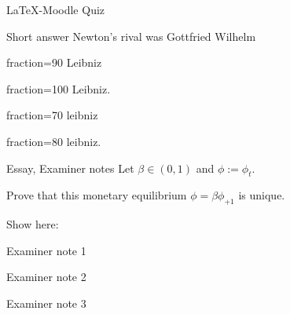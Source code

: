 \documentclass{article}
\begin{document}
\begin{quiz}{LaTeX-Moodle Quiz}
    \begin{shortanswer}[usecase]{Short answer}
        Newton's rival was Gottfried Wilhelm \blank
        \item[fraction=90] Leibniz
        \item[fraction=100] Leibniz.
        \item[fraction=70] leibniz
        \item[fraction=80] leibniz.
    \end{shortanswer}

    \begin{essay}[response format=html+file]{Essay, Examiner notes}
        Let $\beta\in(0,1)$ and $\phi := \phi_{t}$. 
        
        Prove that this monetary equilibrium $\phi = \beta\phi_{+1}$ 
        is unique.

        Show here:
        \item Examiner note 1
        \item Examiner note 2
        \item Examiner note 3  
    \end{essay}


\end{quiz}
\end{document}
